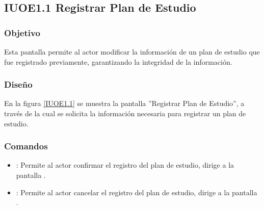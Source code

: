 \subsection{IUOE1.1 Registrar Plan de Estudio}

\subsubsection{Objetivo}
	Esta pantalla permite al actor modificar la información de un plan de estudio que fue registrado previamente, garantizando la integridad de la información.

\subsubsection{Diseño}

    En la figura \ref{IUOE1.1} se muestra la pantalla ''Registrar Plan de Estudio'', a través de la cual se solicita la información necesaria para registrar un plan de estudio.
 

\subsubsection{Comandos}
    \begin{itemize}
	\item {}: Permite al actor confirmar el registro del plan de estudio, dirige a la pantalla .
	
	\item {}: Permite al actor cancelar el registro del plan de estudio, dirige a la pantalla .
    \end{itemize}
